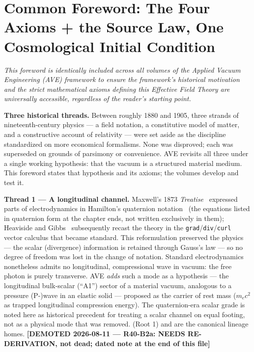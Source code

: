 \chapter*{Common Foreword: The Four Axioms + the Source Law, One Cosmological Initial Condition}

\textit{This foreword is identically included across all volumes of the Applied Vacuum Engineering (AVE) framework to ensure the framework's historical motivation and the strict mathematical axioms defining this Effective Field Theory are universally accessible, regardless of the reader's starting point.}

\vspace{1em}
\noindent \textbf{Three historical threads.} Between roughly 1880 and 1905, three strands of nineteenth-century physics --- a field notation, a constitutive model of matter, and a constructive account of relativity --- were set aside as the discipline standardized on more economical formalisms. None was disproved; each was superseded on grounds of parsimony or convenience. AVE revisits all three under a single working hypothesis: that the vacuum is a structured material medium. This foreword states that hypothesis and its axioms; the volumes develop and test it.

\vspace{1em}
\noindent \textbf{Thread 1 --- A longitudinal channel.} Maxwell's 1873 \emph{Treatise}~\cite{maxwell1873treatise} expressed parts of electrodynamics in Hamilton's quaternion notation~\cite{hamilton1853lectures} (the equations listed in quaternion form at the chapter ends, not written exclusively in them); Heaviside and Gibbs~\cite{heaviside_emtheory, gibbs_wilson1901vector} subsequently recast the theory in the \texttt{grad}/\texttt{div}/\texttt{curl} vector calculus that became standard. This reformulation preserved the physics --- the scalar (divergence) information is retained through Gauss's law --- so no degree of freedom was lost in the change of notation. Standard electrodynamics nonetheless admits no longitudinal, compressional wave in vacuum: the free photon is purely transverse. AVE \emph{adds} such a mode as a hypothesis --- the longitudinal bulk-scalar (``A1'') sector of a material vacuum, analogous to a pressure (P-)wave in an elastic solid --- proposed as the carrier of rest mass ($m_e c^2$ as trapped longitudinal compression energy). The quaternion-era scalar grade is noted here as historical precedent for treating a scalar channel on equal footing, not as a physical mode that was removed.  (Root 1) and  are the canonical lineage homes. \textbf{[DEMOTED 2026-08-11 --- R40-B2a: NEEDS RE-DERIVATION, not dead; dated note at the end of this file]}

